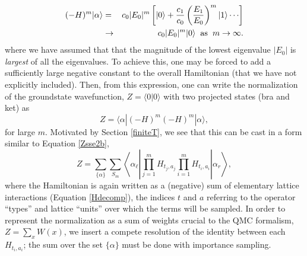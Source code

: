 \documentclass[vecphys]{svmult}
\begin{document}
\begin{eqnarray}
(-H)^m |\alpha \rangle &=& c_0|E_0|^m \left[{  |0 \rangle + \frac{c_1}{c_0} \left({ \frac{E_1}{E_0} }\right)^m|1 \rangle \cdots  }\right] \\
&\rightarrow& c_0|E_0|^m |0 \rangle \hspace{2mm} {\rm as} \hspace{2mm} m \rightarrow \infty. \nonumber
\end{eqnarray}
where we have assumed that that the magnitude of the lowest eigenvalue $|E_0|$ is {\it largest} of all the eigenvalues.  To achieve this, one may be forced to add a sufficiently large negative constant to the overall Hamiltonian (that we have not explicitly included).
Then, from this expression, one can write the normalization of the groundstate wavefunction, $Z=\langle 0 | 0 \rangle$ with two projected states (bra and ket) as
\begin{equation}
Z = \langle \alpha | (-H)^m (-H)^m | \alpha \rangle, \label{normZ2}
\end{equation}
for large $m$.  Motivated by Section \ref{finiteT}, we see that this can be cast in a form similar to Equation \ref{Zsse2b},
\begin{equation}
Z=\sum_{ \{ \alpha\} } \sum_{S_m} 
 \left\langle{\alpha_{\ell}  \left| \prod_{j=1}^{m} {H_{t_j,a_j}}   \prod_{i=1}^{m} {H_{t_i,a_i}} \right| \alpha_r  }\right\rangle,
 \label{Zproj2b}
\end{equation}
where the Hamiltonian is again written as a (negative) sum of elementary lattice interactions (Equation \ref{Hdecomp}), the indices $t$ and $a$ referring to the operator ``types'' and lattice ``units'' over which the terms will be sampled.  
In order to represent the normalization as a sum of weights crucial to the QMC formalism, $Z = \sum_x W(x)$, we insert a compete resolution of the identity between each $H_{t_i,a_i}$; the sum over the set $\{ \alpha \}$ must be done with importance sampling. 
\end{document}
